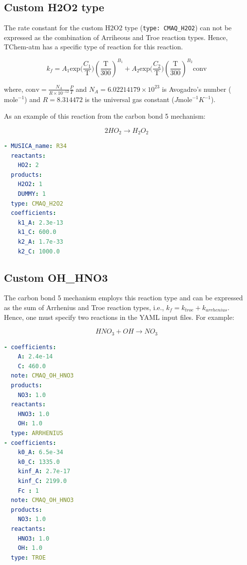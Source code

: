 \documentclass[report, 12pt]{SANDreport}
\begin{document}
\subsection{Custom H2O2 type}

The rate constant for the custom H2O2 type (\verb|type: CMAQ_H2O2|) can not be expressed as the combination of Arriheous and Troe reaction types. Hence, TChem-atm has a specific type of reaction for this reaction.

$$
k_f = A_1 \mathrm{exp} \Big( \frac{C_1}{\mathrm{T}} \Big)
\left(\frac{\mathrm{T}}{300}\right)^{B_1} + A_2 \mathrm{exp} \Big ( \frac{C_2}{\mathrm{T}} \Big) \left(\frac{\mathrm{T}}{300}\right)^{B_2} \mathrm{conv}
$$

where, $\mathrm{conv} = \frac{N_A}{R \times 10^{-12}} \frac{P}{T}$ and $N_A=6.02214179 \times 10^{23}$ is Avogadro's number ($\mathrm{mole}^{-1}$) and $R=8.314472$ is the universal gas constant ($J \mathrm{mole}^{-1}K^{-1}$).

As an example of this reaction from the carbon bond 5 mechanism:

$$
2HO_2 \rightarrow H_2O_2
$$

\begin{lstlisting}[language=yaml]
- MUSICA_name: R34
  reactants:
    HO2: 2
  products:
    H2O2: 1
    DUMMY: 1
  type: CMAQ_H2O2
  coefficients:
    k1_A: 2.3e-13
    k1_C: 600.0
    k2_A: 1.7e-33
    k2_C: 1000.0
\end{lstlisting}
\subsection{Custom OH\_HNO3}

The carbon bond 5 mechanism employs this reaction type and can be expressed as the sum of Arrhenius and Troe reaction types, i.e., $k_f=k_{troe} + k_{arrhenius}$. Hence, one must specify two reactions in the YAML input files. For example:

$$
HNO_3 + OH \rightarrow NO_3
$$

\begin{lstlisting}[language=yaml]
- coefficients:
    A: 2.4e-14
    C: 460.0
  note: CMAQ_OH_HNO3
  products:
    NO3: 1.0
  reactants:
    HNO3: 1.0
    OH: 1.0
  type: ARRHENIUS
- coefficients:
    k0_A: 6.5e-34
    k0_C: 1335.0
    kinf_A: 2.7e-17
    kinf_C: 2199.0
    Fc : 1
  note: CMAQ_OH_HNO3
  products:
    NO3: 1.0
  reactants:
    HNO3: 1.0
    OH: 1.0
  type: TROE
\end{lstlisting}
\end{document}
